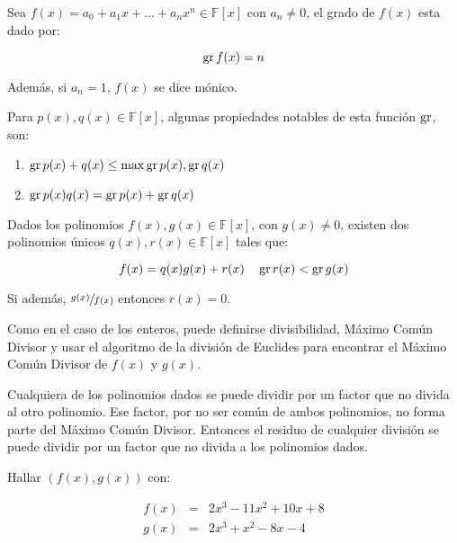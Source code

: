         \begin{definicion}
            Sea $f(x) = a_0 + a_1 x + \dots + a_n x^n \in \mathbb{F}[x]$ con $a_n \ne 0$, el grado de $f(x)$ esta dado por:

            \begin{equation}
                \operatorname{gr}{f(x)} = n
            \end{equation}

            Además, si $a_n = 1$, $f(x)$ se dice mónico.

            Para $p(x), q(x) \in \mathbb{F}[x]$, algunas propiedades notables de esta función $\operatorname{gr}$, son:

            \begin{enumerate}
                \item $\operatorname{gr}{p(x) + q(x)} \leq \max{\operatorname{gr}{p(x)}, \operatorname{gr}{q(x)}}$
                \item $\operatorname{gr}{p(x)q(x)} = \operatorname{gr}{p(x)} + \operatorname{gr}{q(x)}$
            \end{enumerate}
        \end{definicion}

        \begin{observacion}
            Dados los polinomios $f(x), g(x) \in \mathbb{F}[x]$, con $g(x) \ne 0$, existen dos polinomios únicos $q(x), r(x) \in \mathbb{F}[x]$ tales que:

            \begin{equation}
                f(x) = q(x) g(x) + r(x) \quad \operatorname{gr}{r(x)} < \operatorname{gr}{g(x)}
            \end{equation}

            Si además, $\sfrac{g(x)}{f(x)}$ entonces $r(x) = 0$.

            Como en el caso de los enteros, puede definirse divisibilidad, Máximo Común Divisor y usar el algoritmo de la división de Euclides para encontrar el Máximo Común Divisor de $f(x)$ y $g(x)$.

            Cualquiera de los polinomios dados se puede dividir por un factor que no divida al otro polinomio.
            Ese factor, por no ser común de ambos polinomios, no forma parte del Máximo Común Divisor.
            Entonces el residuo de cualquier división se puede dividir por un factor que no divida a los polinomios dados.
        \end{observacion}

        \begin{ejemplo}
            Hallar $(f(x), g(x))$ con:

            \begin{eqnarray*}
                f(x) & = & 2 x^3 - 11 x^2 + 10 x + 8 \\
                g(x) & = & 2 x^3 + x^2 - 8 x - 4
            \end{eqnarray*}

        \end{ejemplo}

